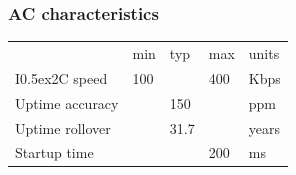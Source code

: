 \documentclass{article}
\newcommand{\two}{\raise0.5ex\hbox{\footnotesize{2}}}
\newcommand{\iic}{I\two{}C}
\newcommand{\heavyline}{\specialrule{1pt}{1pt}{1pt}}
\begin{document}
\subsubsection*{AC characteristics}
\vspace{10 pt}

{\renewcommand{\arraystretch}{1.2}%
\begin{tabularx}{\linewidth}{XC{40pt}C{40pt}C{40pt}C{40pt}}
\heavyline
& min & typ & max & units \\ \heavyline

\iic{} speed                     &100& &400& Kbps   \\ \hline {}
Uptime accuracy               && 150 && ppm           \\ \hline
Uptime rollover               && 31.7 && years        \\ \hline
Startup time & & & 200 & ms \\ \hline
\end{tabularx}}
\vspace{10 pt}



\newpage
\raggedright
{}
\renewcommand{\indexname}{Index}
\printindex
\end{document}
